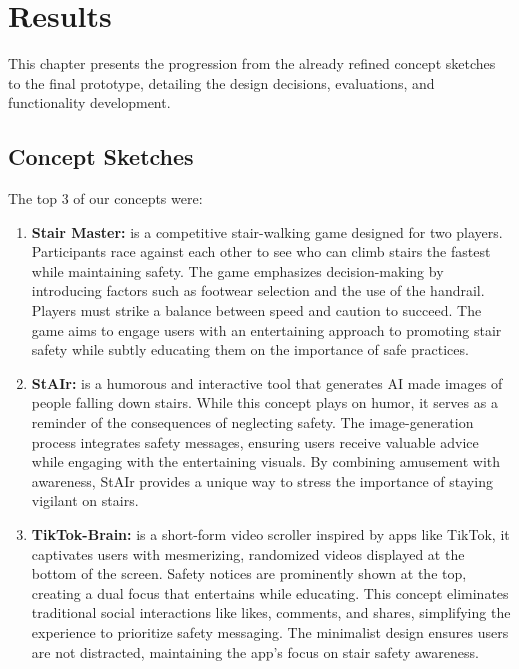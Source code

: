 \documentclass{article}
\begin{document}
\section{Results}
This chapter presents the progression from the already refined concept sketches to the final prototype,
detailing the design decisions, evaluations, and functionality development.

\subsection{Concept Sketches}
The top 3 of our concepts were:

\begin{enumerate}
    \item \textbf{Stair Master:}
is a competitive stair-walking game designed for two players.
Participants race against each other to see who can climb stairs the fastest while maintaining safety.
The game emphasizes decision-making by introducing factors such as footwear selection and the use of the handrail.
Players must strike a balance between speed and caution to succeed.
The game aims to engage users with an entertaining approach to promoting stair safety
while subtly educating them on the importance of safe practices.
    \item \textbf{StAIr:}
is a humorous and interactive tool that generates AI made images of people falling down stairs.
While this concept plays on humor, it serves as a reminder of the consequences of neglecting safety.
The image-generation process integrates safety messages,
ensuring users receive valuable advice while engaging with the entertaining visuals.
By combining amusement with awareness, StAIr provides a unique way to stress the importance of staying vigilant on stairs.
    \item \textbf{TikTok-Brain:}
is a short-form video scroller inspired by apps like TikTok, it captivates users with mesmerizing,
randomized videos displayed at the bottom of the screen.
Safety notices are prominently shown at the top, creating a dual focus that entertains while educating.
This concept eliminates traditional social interactions like likes,
comments, and shares, simplifying the experience to prioritize safety messaging.
The minimalist design ensures users are not distracted, maintaining the app’s focus on stair safety awareness.
\end{enumerate}

\pagebreak
\end{document}
